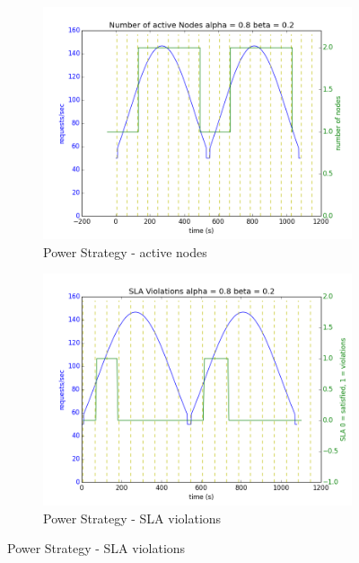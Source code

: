 \documentclass[12pt]{article}
\begin{document}
\begin{figure}[h!]
\begin{subfigure}{.5\textwidth}
\includegraphics[width=\textwidth]{Power382nodes.png}
\caption{Power Strategy - active nodes}
\end{subfigure}
\begin{subfigure}{.5\textwidth}
\includegraphics[width=\textwidth]{Power382SLA.png}
\caption{Power Strategy - SLA violations}
\end{subfigure}


\end{figure}
\end{document}
